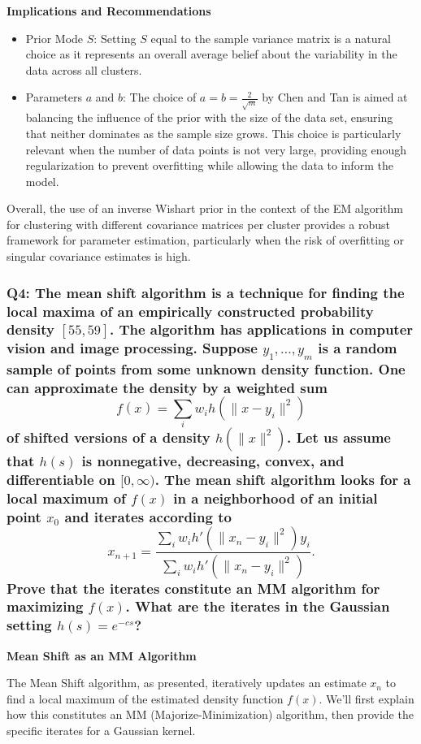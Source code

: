 \documentclass[8pt]{article}
\begin{document}
{\textbf{Implications and Recommendations}
\begin{itemize}
    \item Prior Mode \(S\): Setting \(S\) equal to the sample variance matrix is a natural choice as it represents an overall average belief about the variability in the data across all clusters.
    \item Parameters \(a\) and \(b\): The choice of \(a = b = \frac{2}{\sqrt{m}}\) by Chen and Tan is aimed at balancing the influence of the prior with the size of the data set, ensuring that neither dominates as the sample size grows. This choice is particularly relevant when the number of data points is not very large, providing enough regularization to prevent overfitting while allowing the data to inform the model.
\end{itemize}

Overall, the use of an inverse Wishart prior in the context of the EM algorithm for clustering with different covariance matrices per cluster provides a robust framework for parameter estimation, particularly when the risk of overfitting or singular covariance estimates is high.

\subsubsection*{Q4: The mean shift algorithm is a technique for finding the local maxima of an empirically constructed probability density \([55, 59]\). The algorithm has applications in computer vision and image processing. Suppose \( y_1, \ldots, y_m \) is a random sample of points from some unknown density function. One can approximate the density by a weighted sum
\[
f(x) = \sum_i w_i h(\|x - y_i\|^2)
\]
of shifted versions of a density \( h(\|x\|^2) \). Let us assume that \( h(s) \) is nonnegative, decreasing, convex, and differentiable on \([0, \infty)\). The mean shift algorithm looks for a local maximum of \( f(x) \) in a neighborhood of an initial point \( x_0 \) and iterates according to
\[
x_{n+1} = \frac{\sum_i w_i h'(\|x_n - y_i\|^2) y_i}{\sum_i w_i h'(\|x_n - y_i\|^2)}.
\]
Prove that the iterates constitute an MM algorithm for maximizing \( f(x) \). What are the iterates in the Gaussian setting \( h(s) = e^{-cs} \)?}

\textbf{Mean Shift as an MM Algorithm}

The Mean Shift algorithm, as presented, iteratively updates an estimate \(x_n\) to find a local maximum of the estimated density function \(f(x)\). We'll first explain how this constitutes an MM (Majorize-Minimization) algorithm, then provide the specific iterates for a Gaussian kernel.

}
\end{document}
